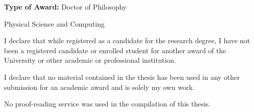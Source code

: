 
\begin{declaration}

{\bf Type of Award:} Doctor of Philosophy

\bigskip

 Physical Science and Computing

\bigskip

\noindent I declare that while registered as a candidate for the research degree, I have not been a registered candidate or enrolled student for another award of the University or other academic or professional institution.


\bigskip

\noindent I declare that no material contained in the thesis has been used in any other submission for an academic award and is solely my own work.


\bigskip




\noindent No proof-reading service was used in the compilation of this thesis.



\bigskip

\end{declaration}

